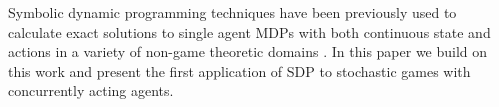 Symbolic dynamic programming techniques have been previously used to
calculate exact solutions to single agent MDPs with both continuous
state and actions in a variety of non-game theoretic domains
\cite{Sanner_UAI_2011,Zamani_AAAI_2012}.  In this paper we build on
this work and present the first application of SDP to stochastic games
with concurrently acting agents.

%





